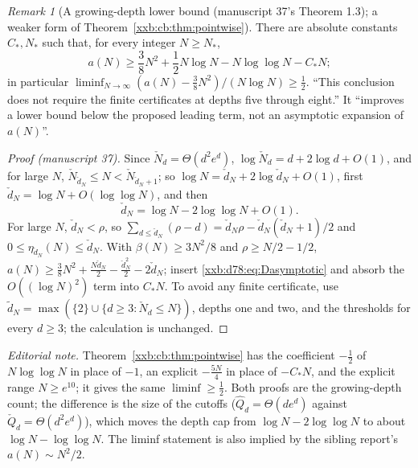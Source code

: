 \documentclass[11pt,a4paper]{article}
\numberwithin{equation}{section}
\theoremstyle{definition}
\theoremstyle{remark}
\newtheorem{remark}[theorem]{Remark}
\theoremstyle{plain}
\begin{document}
\begin{remark}[A growing-depth lower bound (manuscript 37's Theorem 1.3); a weaker form of Theorem~\ref{xxb:cb:thm:pointwise}]\label{xxb:d78:rem:log}
There are absolute constants $C_\ast,N_\ast$ such that, for every integer
$N\ge N_\ast$,
\begin{equation}\label{xxb:d78:eq:loglower}
 a(N)\ge\frac38N^2+\frac12N\log N-N\log\log N-C_\ast N;
\end{equation}
in particular $\liminf_{N\to\infty}(a(N)-\frac38N^2)/(N\log N)\ge\frac12$.
``This conclusion does not require the finite certificates at depths five
through eight.''  It ``improves a lower bound below the proposed leading term,
not an asymptotic expansion of $a(N)$''.
\end{remark}
\begin{proof}[Proof (manuscript 37)]
Since $\check N_d=\Theta(d^2e^d)$, $\log\check N_d=d+2\log d+O(1)$, and for
large $N$, $\check N_{\check d_N}\le N<\check N_{\check d_N+1}$; so
$\log N=\check d_N+2\log\check d_N+O(1)$, first
$\check d_N=\log N+O(\log\log N)$, and then
\begin{equation}\label{xxb:d78:eq:Dasymptotic}
 \check d_N=\log N-2\log\log N+O(1).
\end{equation}
For large $N$, $\check d_N<\rho$, so
$\sum_{d\le\check d_N}(\rho-d)=\check d_N\rho-\check d_N(\check d_N+1)/2$ and
$0\le\eta_{\check d_N}(N)\le\check d_N$.  With $\beta(N)\ge3N^2/8$ and
$\rho\ge N/2-1/2$,
$a(N)\ge\frac38N^2+\frac{N\check d_N}2-\frac{\check d_N^2}2-2\check d_N$;
insert \eqref{xxb:d78:eq:Dasymptotic} and absorb the $O((\log N)^2)$ term into
$C_\ast N$.  To avoid any finite certificate, use
$\tilde d_N=\max(\{2\}\cup\{d\ge3:\check N_d\le N\})$, depths one and two, and
the thresholds for every $d\ge3$; the calculation is unchanged.
\end{proof}
\emph{Editorial note.}  Theorem~\ref{xxb:cb:thm:pointwise} has the coefficient
$-\frac12$ of $N\log\log N$ in place of $-1$, an explicit $-\frac{5N}4$ in place
of $-C_\ast N$, and the explicit range $N\ge e^{10}$; it gives the same
$\liminf\ge\frac12$.  Both proofs are the growing-depth count; the difference
is the size of the cutoffs ($\widehat Q_d=\Theta(de^d)$ against
$\check Q_d=\Theta(d^2e^d)$), which moves the depth cap from
$\log N-2\log\log N$ to about $\log N-\log\log N$.  The liminf statement is
also implied by the sibling report's $a(N)\sim N^2/2$.
\end{document}
